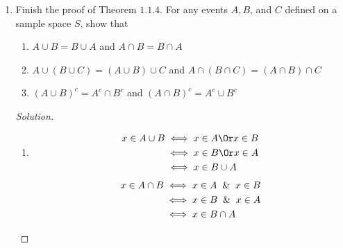 \documentclass[12pt]{article}
\theoremstyle{definition}
\theoremstyle{plain}
\newenvironment{solution}
  {\begin{proof}[Solution]}
  {\end{proof}}
\begin{document}
\begin{enumerate}
\begin{solution}
\begin{enumerate}
	\item \begin{align*}
		x \in A \cup B &\iff x \in A \Or x\in B\\
		&\iff (x \in A \Or x \in B) \And \text{true}\\
		&\iff (x \in A \Or x \in B) \And (x \in A \Or x \notin A)\\
		&\iff x \in A \Or (x \in B \And x \notin A)\\
		&\iff x \in A \Or (x \in B \And x \in A^c)\\
		&\iff x \in A \Or x \in B \cap A^c\\
		&\iff x \in A \cup (B \cap A^c)
	\end{align*}
	\end{enumerate}
	\end{solution}
	
\item Finish the proof of Theorem $ 1.1.4 $. For any events $ A, B $, and $ C $ defined on a sample space $ S $, show that 
	\begin{enumerate}
	\item $ A \cup B = B \cup A $ and $ A \cap B = B \cap A $
	\item $ A \cup (B \cup C) = (A \cup B) \cup C $ and $ A \cap (B \cap C) = (A \cap B) \cap C $
	\item $ (A \cup B)^c = A^c \cap B^c $ and $ (A \cap B)^c = A^c \cup B^c $
	\end{enumerate}
	\begin{solution}
	\begin{enumerate}
	\item \begin{align*}
			x \in A \cup B &\iff x \in A  \Or  x \in B \\
			& \iff x \in B \Or x \in A\\
			& \iff x \in B \cup A
		\end{align*}
		\begin{align*}
			x \in A \cap B &\iff x \in A  \And  x \in B \\
			& \iff x \in B \And x \in A\\
			& \iff x \in B \cap A
		\end{align*}
		

\end{enumerate}
\end{solution}
\end{enumerate}
\end{document}
